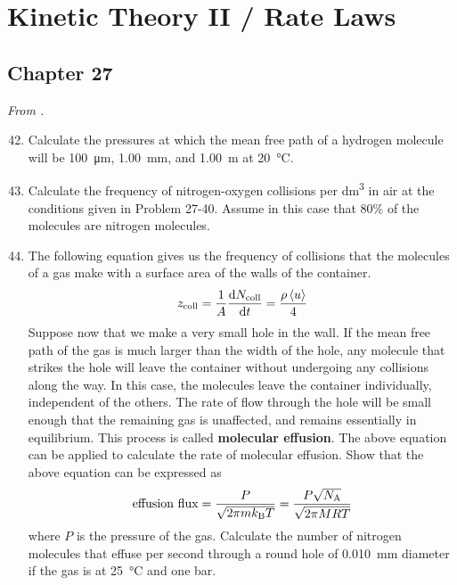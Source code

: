 \documentclass[../psets.tex]{subfiles}
\begin{document}
\section{Kinetic Theory II / Rate Laws}
\subsection*{Chapter 27}
\emph{From \textcite{bib:McQuarrieSimon}.}
\begin{enumerate}[label={\textbf{27-\arabic*.}},leftmargin=3.5em]
    \setcounter{enumi}{41}
    \item {}Calculate the pressures at which the mean free path of a hydrogen molecule will be \SI{100}{\micro\meter}, \SI{1.00}{\milli\meter}, and \SI{1.00}{\meter} at \SI{20}{\celsius}.
    \item Calculate the frequency of nitrogen-oxygen collisions per \si{\cubic\deci\meter} in air at the conditions given in Problem 27-40. Assume in this case that 80\% of the molecules are nitrogen molecules.
    \setcounter{enumi}{48}
    \item The following equation gives us the frequency of collisions that the molecules of a gas make with a surface area of the walls of the container.
    \begin{equation*}
        z_\text{coll} = \frac{1}{A}\dv{N_\text{coll}}{t}
        = \frac{\rho\left\langle{u}\right\rangle}{4}
    \end{equation*}
    Suppose now that we make a very small hole in the wall. If the mean free path of the gas is much larger than the width of the hole, any molecule that strikes the hole will leave the container without undergoing any collisions along the way. In this case, the molecules leave the container individually, independent of the others. The rate of flow through the hole will be small enough that the remaining gas is unaffected, and remains essentially in equilibrium. This process is called \textbf{molecular effusion}. The above equation can be applied to calculate the rate of molecular effusion. Show that the above equation can be expressed as
    \begin{equation}
        \text{effusion flux} = \frac{P}{\sqrt{2\pi mk_\text{B} T}}
        = \frac{P\sqrt{N_\text{A}}}{\sqrt{2\pi MRT}}
    \end{equation}
    where $P$ is the pressure of the gas. Calculate the number of nitrogen molecules that effuse per second through a round hole of \SI{0.010}{\milli\meter} diameter if the gas is at \SI{25}{\celsius} and one bar.
    \setcounter{enumi}{51}

\end{enumerate}
\end{document}
